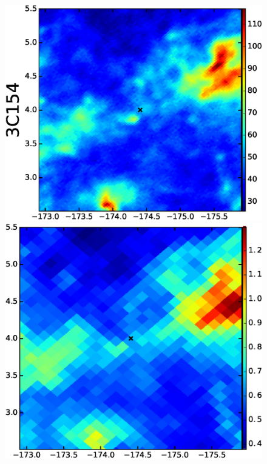 \documentclass[preprint]{emulateapj}
\begin{document}
\begin{figure}[h!]
\includegraphics[scale=0.23]{fig/src_eg_apd0_r1c0.eps}
\includegraphics[scale=0.21]{fig/src_eg_apd0_r1c1.eps}

\end{figure}
\end{document}
